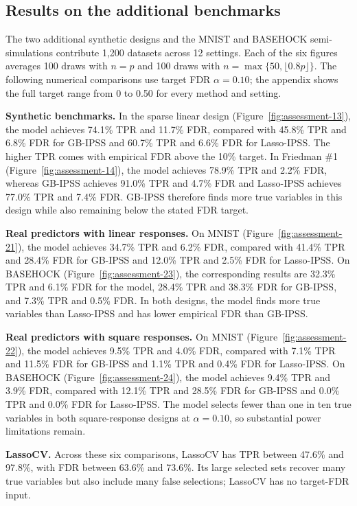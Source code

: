 \documentclass[10pt,letterpaper]{article}
\begin{document}
\subsection{Results on the additional benchmarks}
The two additional synthetic designs and the MNIST and BASEHOCK
semi-simulations contribute 1,200 datasets across 12 settings. Each of the
six figures averages 100 draws with $n=p$ and 100 draws with
$n=\max\{50,\lfloor0.8p\rfloor\}$. The following numerical comparisons
use target FDR $\alpha=0.10$; the appendix shows the full target range
from 0 to 0.50 for every method and setting.


\textbf{Synthetic benchmarks.} In the sparse linear design (Figure~\ref{fig:assessment-13}), the model achieves 74.1\% TPR and 11.7\% FDR, compared with 45.8\% TPR and 6.8\% FDR for GB-IPSS and 60.7\% TPR and 6.6\% FDR for Lasso-IPSS. The higher TPR comes with empirical FDR above the 10\% target. In Friedman \#1 (Figure~\ref{fig:assessment-14}), the model achieves 78.9\% TPR and 2.2\% FDR, whereas GB-IPSS achieves 91.0\% TPR and 4.7\% FDR and Lasso-IPSS achieves 77.0\% TPR and 7.4\% FDR. GB-IPSS therefore finds more true variables in this design while also remaining below the stated FDR target.

\textbf{Real predictors with linear responses.} On MNIST (Figure~\ref{fig:assessment-21}), the model achieves 34.7\% TPR and 6.2\% FDR, compared with 41.4\% TPR and 28.4\% FDR for GB-IPSS and 12.0\% TPR and 2.5\% FDR for Lasso-IPSS. On BASEHOCK (Figure~\ref{fig:assessment-23}), the corresponding results are 32.3\% TPR and 6.1\% FDR for the model, 28.4\% TPR and 38.3\% FDR for GB-IPSS, and 7.3\% TPR and 0.5\% FDR. In both designs, the model finds more true variables than Lasso-IPSS and has lower empirical FDR than GB-IPSS.

\textbf{Real predictors with square responses.} On MNIST (Figure~\ref{fig:assessment-22}), the model achieves 9.5\% TPR and 4.0\% FDR, compared with 7.1\% TPR and 11.5\% FDR for GB-IPSS and 1.1\% TPR and 0.4\% FDR for Lasso-IPSS. On BASEHOCK (Figure~\ref{fig:assessment-24}), the model achieves 9.4\% TPR and 3.9\% FDR, compared with 12.1\% TPR and 28.5\% FDR for GB-IPSS and 0.0\% TPR and 0.0\% FDR for Lasso-IPSS. The model selects fewer than one in ten true variables in both square-response designs at $\alpha=0.10$, so substantial power limitations remain.

\textbf{LassoCV.} Across these six comparisons, LassoCV has TPR between 47.6\% and 97.8\%, with FDR between 63.6\% and 73.6\%. Its large selected sets recover many true variables but also include many false selections; LassoCV has no target-FDR input.
\end{document}
